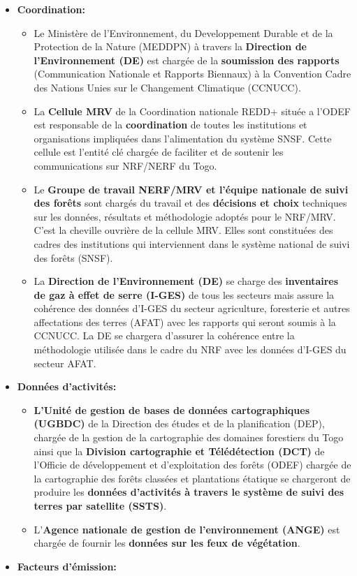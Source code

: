 \documentclass[a4paper, notitlepage, 12pt, krantz2]{krantz}
\begin{document}
\begin{itemize}
\item
  \textbf{Coordination:}

  \begin{itemize}
  \item
    Le Ministère de l'Environnement, du Developpement Durable et de la Protection de la Nature (MEDDPN) à travers la \textbf{Direction de l'Environnement (DE)} est chargée de la \textbf{soumission des rapports} (Communication Nationale et Rapports Biennaux) à la Convention Cadre des Nations Unies sur le Changement Climatique (CCNUCC).
  \item
    La \textbf{Cellule MRV} de la Coordination nationale REDD+ située a l'ODEF est responsable de la \textbf{coordination} de toutes les institutions et organisations impliquées dans l'alimentation du système SNSF. Cette cellule est l'entité clé chargée de faciliter et de soutenir les communications sur NRF/NERF du Togo.
  \item
    Le \textbf{Groupe de travail NERF/MRV et l'équipe nationale de suivi des forêts} sont chargés du travail et des \textbf{décisions et choix} techniques sur les données, résultats et méthodologie adoptés pour le NRF/MRV. C'est la cheville ouvrière de la cellule MRV. Elles sont constituées des cadres des institutions qui interviennent dans le système national de suivi des forêts (SNSF).
  \item
    La \textbf{Direction de l'Environnement (DE)} se charge des \textbf{inventaires de gaz à effet de serre (I-GES)} de tous les secteurs mais assure la cohérence des données d'I-GES du secteur agriculture, foresterie et autres affectations des terres (AFAT) avec les rapports qui seront soumis à la CCNUCC. La DE se chargera d'assurer la cohérence entre la méthodologie utilisée dans le cadre du NRF avec les données d'I-GES du secteur AFAT.
  \end{itemize}
\item
  \textbf{Données d'activités:}

  \begin{itemize}
  \item
    \textbf{L'Unité de gestion de bases de données cartographiques (UGBDC)} de la Direction des études et de la planification (DEP), chargée de la gestion de la cartographie des domaines forestiers du Togo ainsi que la \textbf{Division cartographie et Télédétection (DCT)} de l'Officie de développement et d'exploitation des forêts (ODEF) chargée de la cartographie des forêts classées et plantations étatique se chargeront de produire les \textbf{données d'activités à travers le système de suivi des terres par satellite (SSTS)}.
  \item
    L'\textbf{Agence nationale de gestion de l'environnement (ANGE)} est chargée de fournir les \textbf{données sur les feux de végétation}.
  \end{itemize}
\item
  \textbf{Facteurs d'émission:}


\end{itemize}
\end{document}
